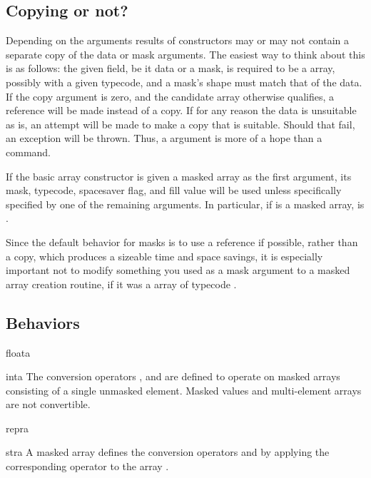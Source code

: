 \subsection{Copying or not?}
\label{sec:numarray.ma:copying-or-not}

Depending on the arguments results of constructors may or may not contain a
separate copy of the data or mask arguments. The easiest way to think about
this is as follows: the given field, be it data or a mask, is required to be a
\module{\numarray} array, possibly with a given typecode, and a mask's shape
must match that of the data. If the copy argument is zero, and the candidate
array otherwise qualifies, a reference will be made instead of a copy. If for
any reason the data is unsuitable as is, an attempt will be made to make a copy
that is suitable. Should that fail, an exception will be thrown. Thus, a
 argument is more of a hope than a command.

If the basic array constructor is given a masked
array as the first argument, its mask, typecode, spacesaver flag, and fill
value will be used unless specifically specified by one of the remaining
arguments. In particular, if  is a masked array, 
is .

Since the default behavior for masks is to use a reference if possible, rather
than a copy, which produces a sizeable time and space savings, it is especially
important not to modify something you used as a mask argument to a masked array
creation routine, if it was a \module{\numarray} array of typecode
.





\subsection{Behaviors}
\label{sec:numarray.ma:behaviors}
\begin{funcdesc}{float}{a}
\end{funcdesc}
\begin{funcdesc}{int}{a}
  The conversion operators , and  are defined
  to operate on masked arrays consisting of a single unmasked element.
  Masked values and multi-element arrays are not convertible.  
\end{funcdesc}
\begin{funcdesc}{repr}{a}
\end{funcdesc}
\begin{funcdesc}{str}{a}
  A masked array defines the conversion operators  and
   by applying the corresponding operator to the
  \module{\numarray} array .  
\end{funcdesc}



